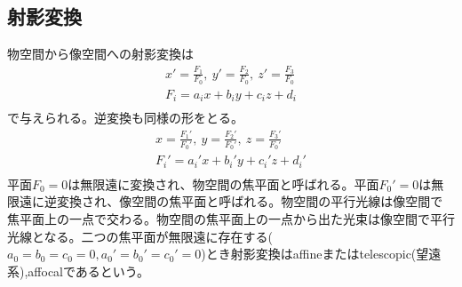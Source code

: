 \subsection{射影変換}
	物空間から像空間への射影変換は
	\begin{align*}
		x' = \frac{F_1}{F_0},\ y' = \frac{F_2}{F_0},\ z' = \frac{F_3}{F_0}\\
		F_i = a_ix + b_iy + c_iz + d_i\\
	\end{align*}
	で与えられる。逆変換も同様の形をとる。
	\begin{align*}
		x = \frac{F_1'}{F_0'},\ y = \frac{F_2'}{F_0'},\ z = \frac{F_3'}{F_0'}\\
		F_i' = a_i'x + b_i'y + c_i'z + d_i'\\
	\end{align*}
	平面$F_0 = 0$は無限遠に変換され、物空間の焦平面と呼ばれる。平面$F_0' = 0$は無限遠に逆変換され、像空間の焦平面と呼ばれる。物空間の平行光線は像空間で焦平面上の一点で交わる。物空間の焦平面上の一点から出た光束は像空間で平行光線となる。二つの焦平面が無限遠に存在する($a_0=b_0=c_0=0, a_0'=b_0'=c_0'=0$)とき射影変換はaffineまたはtelescopic(望遠系),affocalであるという。

